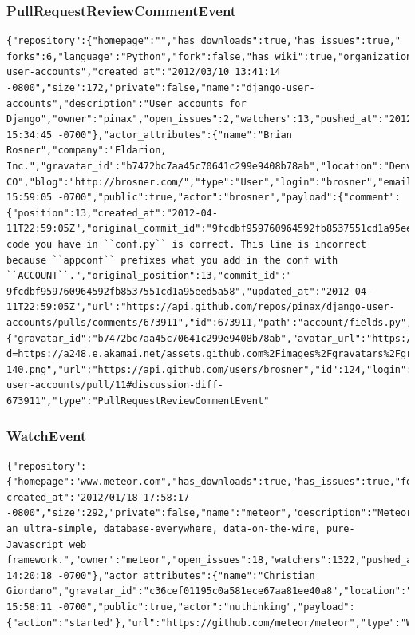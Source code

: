\documentclass[a4paper,10pt]{article}
\begin{document}
\subsubsection{PullRequestReviewCommentEvent}
\begin{lstlisting}
{"repository":{"homepage":"","has_downloads":true,"has_issues":true,"
forks":6,"language":"Python","fork":false,"has_wiki":true,"organization":"pinax","url":"https://github.com/pinax/django-user-accounts","created_at":"2012/03/10 13:41:14 -0800","size":172,"private":false,"name":"django-user-accounts","description":"User accounts for Django","owner":"pinax","open_issues":2,"watchers":13,"pushed_at":"2012/04/11 15:34:45 -0700"},"actor_attributes":{"name":"Brian Rosner","company":"Eldarion, Inc.","gravatar_id":"b7472bc7aa45c70641c299e9408b78ab","location":"Denver, CO","blog":"http://brosner.com/","type":"User","login":"brosner","email":"brosner@gmail.com"},"created_at":"2012/04/11 15:59:05 -0700","public":true,"actor":"brosner","payload":{"comment":{"position":13,"created_at":"2012-04-11T22:59:05Z","original_commit_id":"9fcdbf959760964592fb8537551cd1a95eed5a58","body":"The code you have in ``conf.py`` is correct. This line is incorrect because ``appconf`` prefixes what you add in the conf with ``ACCOUNT``.","original_position":13,"commit_id":"
9fcdbf959760964592fb8537551cd1a95eed5a58","updated_at":"2012-04-11T22:59:05Z","url":"https://api.github.com/repos/pinax/django-user-accounts/pulls/comments/673911","id":673911,"path":"account/fields.py","user":{"gravatar_id":"b7472bc7aa45c70641c299e9408b78ab","avatar_url":"https://secure.gravatar.com/avatar/b7472bc7aa45c70641c299e9408b78ab?d=https://a248.e.akamai.net/assets.github.com%2Fimages%2Fgravatars%2Fgravatar-140.png","url":"https://api.github.com/users/brosner","id":124,"login":"brosner"}}},"url":"https://github.com/pinax/django-user-accounts/pull/11#discussion-diff-673911","type":"PullRequestReviewCommentEvent"
\end{lstlisting}


\subsubsection{WatchEvent}
\begin{lstlisting}
{"repository":{"homepage":"www.meteor.com","has_downloads":true,"has_issues":true,"forks":54,"language":"JavaScript","fork":false,"has_wiki":true,"organization":"meteor","url":"https://github.com/meteor/meteor","
created_at":"2012/01/18 17:58:17 -0800","size":292,"private":false,"name":"meteor","description":"Meteor, an ultra-simple, database-everywhere, data-on-the-wire, pure-Javascript web framework.","owner":"meteor","open_issues":18,"watchers":1322,"pushed_at":"2012/04/11 14:20:18 -0700"},"actor_attributes":{"name":"Christian Giordano","gravatar_id":"c36cef01195c0a581ece67aa81ee40a8","location":"London","blog":"http://nuthinking.com","type":"User","login":"nuthinking","email":"christian@nuthinking.com"},"created_at":"2012/04/11 15:58:11 -0700","public":true,"actor":"nuthinking","payload":{"action":"started"},"url":"https://github.com/meteor/meteor","type":"WatchEvent"
\end{lstlisting}
\end{document}
